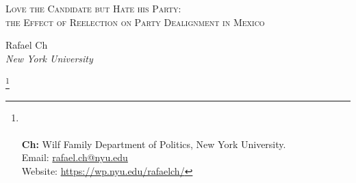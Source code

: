 \documentclass[12pt]{amsart}
\title{}
\numberwithin{equation}{section}
\theoremstyle{definition}
\theoremstyle{definition}
\theoremstyle{definition}
\begin{document}
	\vspace*{3ex minus 1ex}
	\begin{center}
		\Large \textsc{Love the Candidate but Hate his Party: \\ the Effect of Reelection on Party Dealignment in Mexico} %
	\end{center}
	
	
\date{May 14, 2021} 
\vspace*{3ex minus 1ex}
	\begin{center}
		Rafael Ch\\
		
		\textit{New York University}\\
		
	\end{center}
	 
	\thanks{%
	\\
	 \\ \textbf{Ch:} Wilf Family Department of Politics, New York University. \\ Email: \url{rafael.ch@nyu.edu}
	 \\ Website: \url{https://wp.nyu.edu/rafaelch/}}
		  
\end{document}
